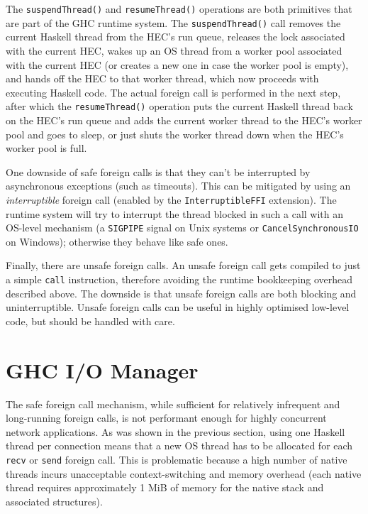\documentclass[a4paper,11pt,oneside]{report}
\begin{document}
The \texttt{suspendThread()} and \texttt{resumeThread()} operations are both
primitives that are part of the GHC runtime system. The \texttt{suspendThread()}
call removes the current Haskell thread from the HEC's run queue, releases the
lock associated with the current HEC, wakes up an OS thread from a worker pool
associated with the current HEC (or creates a new one in case the worker pool is
empty), and hands off the HEC to that worker thread, which now proceeds with
executing Haskell code. The actual foreign call is performed in the next step,
after which the \texttt{resumeThread()} operation puts the current Haskell
thread back on the HEC's run queue and adds the current worker thread to the
HEC's worker pool and goes to sleep, or just shuts the worker thread down when
the HEC's worker pool is full.

One downside of safe foreign calls is that they can't be interrupted by
asynchronous exceptions (such as timeouts). This can be mitigated by using an
\textit{interruptible} foreign call (enabled by the \texttt{InterruptibleFFI}
extension). The runtime system will try to interrupt the thread blocked in such
a call with an OS-level mechanism (a \texttt{SIGPIPE} signal on Unix systems or
\texttt{CancelSynchronousIO} on Windows); otherwise they behave like safe ones.

Finally, there are unsafe foreign calls. An unsafe foreign call gets compiled to
just a simple \texttt{call} instruction, therefore avoiding the runtime
bookkeeping overhead described above. The downside is that unsafe foreign calls
are both blocking and uninterruptible. Unsafe foreign calls can be useful in
highly optimised low-level code, but should be handled with care.

\section{GHC I/O Manager}

The safe foreign call mechanism, while sufficient for relatively infrequent and
long-running foreign calls, is not performant enough for highly concurrent
network applications. As was shown in the previous section, using one Haskell
thread per connection means that a new OS thread has to be allocated for each
\texttt{recv} or \texttt{send} foreign call. This is problematic because a high
number of native threads incurs unacceptable context-switching and memory
overhead (each native thread requires approximately 1 MiB of memory for the
native stack and associated structures).
\end{document}
